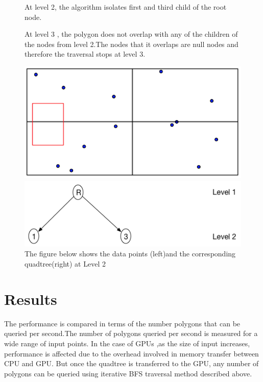 \documentclass{article}
\begin{document}
\begin{figure}[ht]
At level 2, the algorithm isolates first and third child of the root node.

At level 3 , the polygon does not overlap with any of the children of the nodes from level 2.The nodes that it overlaps are null nodes and therefore the traversal stops at level 3.
\caption{The figure below shows the data points (left)and the corresponding quadtree(right) at Level 2}
  \centering
  \begin{minipage}[b]{0.35\textwidth}
    \includegraphics[width=\textwidth]{NoPointQuad2}  
  \end{minipage}
  \hfill
  \begin{minipage}[b]{0.6\textwidth}
    \includegraphics[width=\textwidth]{NoPoints3_1}
  \end{minipage}
\end{figure}


\clearpage
\section{Results}
The performance is compared in terms of the number polygons that can be queried per second.The number of polygons queried per second is measured for a wide range of input points. In the case of GPUs ,as the size of input increases, performance is affected due to the overhead involved in  memory transfer between CPU and GPU. But once the quadtree is transferred to the GPU, any number of polygons can be queried using iterative BFS traversal method described above. 
\end{document}
